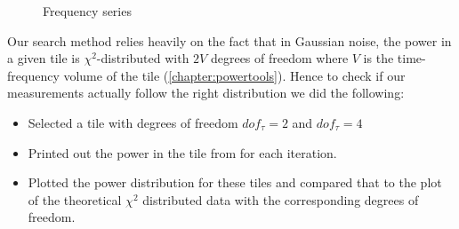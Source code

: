 \documentclass{article}
\begin{document}
\begin{figure}
\begin{center}
\caption{Frequency series}
\label{fig:gaussianfreqseries}
\end{center}
\end{figure}
 
Our search method relies heavily on the fact that in Gaussian noise, 
 the power in a given tile is $\chi^2$-distributed with 
$2 V$ degrees of freedom where $V$ is the time-frequency volume of the 
tile (\ref{chapter:powertools}).  Hence to check if our measurements 
actually follow the right distribution we did the following:
\begin{itemize}
\item Selected a tile with degrees of freedom $dof_{\tau} = 2$ and $dof_{\tau} = 4$
\item Printed out the power in the tile from for each iteration.
\item Plotted the power distribution for these tiles and compared that to
the plot of the theoretical $\chi^2$ distributed data with the
corresponding degrees of freedom. 
\end{itemize}
\end{document}
